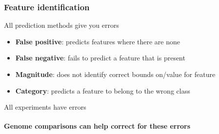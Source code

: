 %
\begin{frame}
  \frametitle{Feature identification}
  \textcolor{hutton_green}{All prediction methods give you errors}
  \begin{itemize}
    \item \textbf{False positive}: predicts features where there are none
    \item \textbf{False negative}: fails to predict a feature that is present
    \item \textbf{Magnitude}: does not identify correct bounds on/value for feature
    \item \textbf{Category}: predicts a feature to belong to the wrong class
  \end{itemize}
  \textcolor{hutton_blue}{All experiments have errors} \\~\\
  \textcolor{hutton_purple}{\textbf{Genome comparisons can help correct for these errors}}
\end{frame}